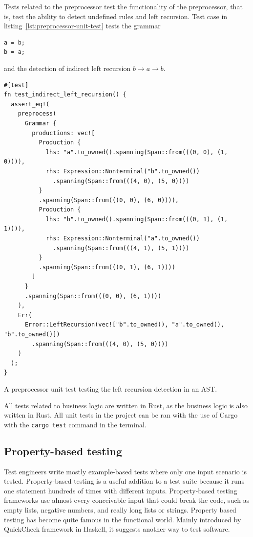 \documentclass[english,engineering]{wizthesis}
\begin{document}
Tests related to the preprocessor test the functionality of the preprocessor,
that is, test the ability to detect undefined rules and left recursion. Test
case in listing~\ref{lst:preprocessor-unit-test} tests the grammar
\begin{verbatim}
a = b;
b = a;
\end{verbatim}
and the detection of indirect left recursion $b \rightarrow a \rightarrow b$.

\begin{listing}[H]
  \begin{verbatim}
#[test]
fn test_indirect_left_recursion() {
  assert_eq!(
    preprocess(
      Grammar {
        productions: vec![
          Production {
            lhs: "a".to_owned().spanning(Span::from(((0, 0), (1, 0)))),
            rhs: Expression::Nonterminal("b".to_owned())
              .spanning(Span::from(((4, 0), (5, 0))))
          }
          .spanning(Span::from(((0, 0), (6, 0)))),
          Production {
            lhs: "b".to_owned().spanning(Span::from(((0, 1), (1, 1)))),
            rhs: Expression::Nonterminal("a".to_owned())
              .spanning(Span::from(((4, 1), (5, 1))))
          }
          .spanning(Span::from(((0, 1), (6, 1))))
        ]
      }
      .spanning(Span::from(((0, 0), (6, 1))))
    ),
    Err(
      Error::LeftRecursion(vec!["b".to_owned(), "a".to_owned(), "b".to_owned()])
        .spanning(Span::from(((4, 0), (5, 0))))
    )
  );
}
  \end{verbatim}
  \caption{A preprocessor unit test testing the left recursion detection in an
  AST.}
  \label{lst:preprocessor-unit-test}
\end{listing}

All tests related to business logic are written in Rust, as the business logic
is also written in Rust. All unit tests in the project can be ran with the use
of Cargo with the \texttt{cargo test} command in the terminal.

\subsection{Property-based testing}

Test engineers write mostly example-based tests where only one input scenario is
tested. Property-based testing is a useful addition to a test suite because it
runs one statement hundreds of times with different inputs. Property-based
testing frameworks use almost every conceivable input that could break the
code, such as empty lists, negative numbers, and really long lists or strings.
Property based testing has become quite famous in the functional world. Mainly
introduced by QuickCheck framework in Haskell, it suggests another way to test
software.
\end{document}
